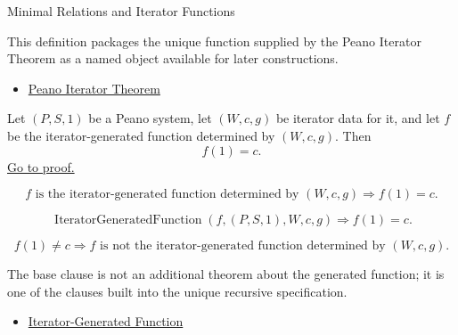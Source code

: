\begin{topicbox}{Minimal Relations and Iterator Functions}
\begin{remark*}[Interpretation]
This definition packages the unique function supplied by the Peano Iterator
Theorem as a named object available for later constructions.
\end{remark*}

\begin{dependencies}
\begin{itemize}
  \item \hyperref[thm:peano-iterator-theorem]{Peano Iterator Theorem}
\end{itemize}
\end{dependencies}

\begin{tcolorbox}[colback=thmbox, colframe=thmborder, arc=2pt,
  left=6pt, right=6pt, top=4pt, bottom=4pt,
  title={\small\textbf{Theorem (Iterator Base Clause)}},
  fonttitle=\small\bfseries]
\begin{theorem}
\label{thm:iterator-base-value}
Let $(P,S,1)$ be a Peano system, let $(W,c,g)$ be iterator data for it, and let
$f$ be the iterator-generated function determined by $(W,c,g)$. Then
\[
f(1)=c.
\]
\hyperref[prf:iterator-base-value]{Go to proof.}
\end{theorem}
\end{tcolorbox}

\begin{remark*}
\[
f \text{ is the iterator-generated function determined by } (W,c,g)
\Longrightarrow f(1)=c.
\]
\end{remark*}

\begin{remark*}
\[
\operatorname{IteratorGeneratedFunction}(f,(P,S,1),W,c,g)
\Longrightarrow f(1)=c.
\]
\end{remark*}

\begin{remark*}
\[
f(1)\neq c
\Longrightarrow
f \text{ is not the iterator-generated function determined by } (W,c,g).
\]
\end{remark*}

\begin{remark*}[Interpretation]
The base clause is not an additional theorem about the generated function; it
is one of the clauses built into the unique recursive specification.
\end{remark*}

\begin{dependencies}
\begin{itemize}
  \item \hyperref[def:iterator-generated-function]{Iterator-Generated Function}
\end{itemize}
\end{dependencies}


\end{topicbox}
